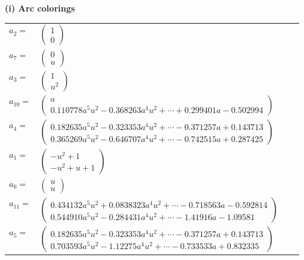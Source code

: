 \documentclass[1p]{elsarticle_modified}
\theoremstyle{definition}
\begin{document}
\flushleft \textbf{(i) Arc colorings}\\
\begin{tabular}{m{7pt} m{180pt} m{7pt} m{180pt} }
\flushright $a_{2}=$&$\begin{pmatrix}1\\0\end{pmatrix}$ \\
\flushright $a_{7}=$&$\begin{pmatrix}0\\u\end{pmatrix}$ \\
\flushright $a_{3}=$&$\begin{pmatrix}1\\u^2\end{pmatrix}$ \\
\flushright $a_{10}=$&$\begin{pmatrix}a\\0.110778 a^{5} u^{2}-0.368263 a^{4} u^{2}+\cdots+0.299401 a-0.502994\end{pmatrix}$ \\
\flushright $a_{4}=$&$\begin{pmatrix}0.182635 a^{5} u^{2}-0.323353 a^{4} u^{2}+\cdots-0.371257 a+0.143713\\0.365269 a^{5} u^{2}-0.646707 a^{4} u^{2}+\cdots-0.742515 a+0.287425\end{pmatrix}$ \\
\flushright $a_{1}=$&$\begin{pmatrix}- u^2+1\\- u^2+u+1\end{pmatrix}$ \\
\flushright $a_{6}=$&$\begin{pmatrix}u\\u\end{pmatrix}$ \\
\flushright $a_{11}=$&$\begin{pmatrix}0.434132 a^{5} u^{2}+0.0838323 a^{4} u^{2}+\cdots-0.718563 a-0.592814\\0.544910 a^{5} u^{2}-0.284431 a^{4} u^{2}+\cdots-1.41916 a-1.09581\end{pmatrix}$ \\
\flushright $a_{5}=$&$\begin{pmatrix}0.182635 a^{5} u^{2}-0.323353 a^{4} u^{2}+\cdots-0.371257 a+0.143713\\0.703593 a^{5} u^{2}-1.12275 a^{4} u^{2}+\cdots-0.733533 a+0.832335\end{pmatrix}$ \\

\end{tabular}
\end{document}
